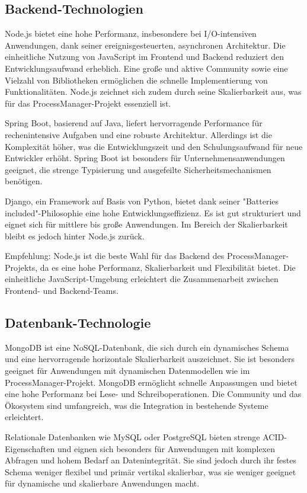 \subsection{Backend-Technologien}
Node.js bietet eine hohe Performanz, insbesondere bei I/O-intensiven Anwendungen, dank seiner ereignisgesteuerten, asynchronen Architektur. Die einheitliche Nutzung von JavaScript im Frontend und Backend reduziert den Entwicklungsaufwand erheblich. Eine große und aktive Community sowie eine Vielzahl von Bibliotheken ermöglichen die schnelle Implementierung von Funktionalitäten. Node.js zeichnet sich zudem durch seine Skalierbarkeit aus, was für das ProcessManager-Projekt essenziell ist.

Spring Boot, basierend auf Java, liefert hervorragende Performance für rechenintensive Aufgaben und eine robuste Architektur. Allerdings ist die Komplexität höher, was die Entwicklungszeit und den Schulungsaufwand für neue Entwickler erhöht. Spring Boot ist besonders für Unternehmensanwendungen geeignet, die strenge Typisierung und ausgefeilte Sicherheitsmechanismen benötigen.

Django, ein Framework auf Basis von Python, bietet dank seiner "Batteries included"-Philosophie eine hohe Entwicklungseffizienz. Es ist gut strukturiert und eignet sich für mittlere bis große Anwendungen. Im Bereich der Skalierbarkeit bleibt es jedoch hinter Node.js zurück.

Empfehlung: Node.js ist die beste Wahl für das Backend des ProcessManager-Projekts, da es eine hohe Performanz, Skalierbarkeit und Flexibilität bietet. Die einheitliche JavaScript-Umgebung erleichtert die Zusammenarbeit zwischen Frontend- und Backend-Teams.

\subsection{Datenbank-Technologie}
MongoDB ist eine NoSQL-Datenbank, die sich durch ein dynamisches Schema und eine hervorragende horizontale Skalierbarkeit auszeichnet. Sie ist besonders geeignet für Anwendungen mit dynamischen Datenmodellen wie im ProcessManager-Projekt. MongoDB ermöglicht schnelle Anpassungen und bietet eine hohe Performanz bei Lese- und Schreiboperationen. Die Community und das Ökosystem sind umfangreich, was die Integration in bestehende Systeme erleichtert.

Relationale Datenbanken wie MySQL oder PostgreSQL bieten strenge ACID-Eigenschaften und eignen sich besonders für Anwendungen mit komplexen Abfragen und hohem Bedarf an Datenintegrität. Sie sind jedoch durch ihr festes Schema weniger flexibel und primär vertikal skalierbar, was sie weniger geeignet für dynamische und skalierbare Anwendungen macht.

